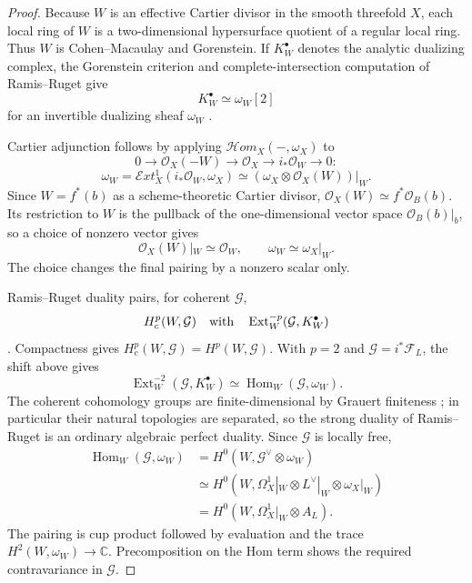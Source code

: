 \begin{proof}
Because $W$ is an effective Cartier divisor in the smooth threefold $X$,
each local ring of $W$ is a two-dimensional hypersurface quotient of a
regular local ring.  Thus $W$ is Cohen--Macaulay and Gorenstein.  If
$K_W^\bullet$ denotes the analytic dualizing complex, the Gorenstein
criterion and complete-intersection computation of Ramis--Ruget give
\[
 K_W^\bullet\simeq\omega_W[2]
\]
for an invertible dualizing sheaf $\omega_W$
\cite[Proposition~2 and the complete-intersection calculation,
pp.~90--91]{RamisRuget1970}.

Cartier adjunction follows by applying
$\mathcal Hom_X(-,\omega_X)$ to
\[
0\longrightarrow\mathcal O_X(-W)\longrightarrow\mathcal O_X
 \longrightarrow i_*\mathcal O_W\longrightarrow0:
\]
\[
 \omega_W=\mathcal Ext_X^1(i_*\mathcal O_W,\omega_X)
 \simeq(\omega_X\otimes\mathcal O_X(W))|_W.
\]
Since $W=f^*(b)$ as a scheme-theoretic Cartier divisor,
$\mathcal O_X(W)\simeq f^*\mathcal O_B(b)$.  Its restriction to $W$ is the
pullback of the one-dimensional vector space $\mathcal O_B(b)|_b$, so a
choice of nonzero vector gives
\[
 \mathcal O_X(W)|_W\simeq\mathcal O_W,
 \qquad \omega_W\simeq\omega_X|_W.
\]
The choice changes the final pairing by a nonzero scalar only.

Ramis--Ruget duality pairs, for coherent $\mathcal G$,
\[
 H_c^p(W,\mathcal G)
 \quad\hbox{with}\quad
 \operatorname{Ext}^{-p}_W(\mathcal G,K_W^\bullet)
\]
\cite[Theorem~2, pp.~82--83]{RamisRuget1970}.  Compactness gives
$H_c^p(W,\mathcal G)=H^p(W,\mathcal G)$.  With
$p=2$ and $\mathcal G=i^*\mathcal F_L$, the shift above gives
\[
 \operatorname{Ext}^{-2}_W(\mathcal G,K_W^\bullet)
 \simeq\operatorname{Hom}_W(\mathcal G,\omega_W).
\]
The coherent cohomology groups are finite-dimensional by Grauert finiteness
\cite{Grauert1960}; in particular their natural topologies are separated,
so the strong duality of Ramis--Ruget is an ordinary algebraic perfect
duality.  Since $\mathcal G$ is locally free,
\[
\begin{aligned}
 \operatorname{Hom}_W(\mathcal G,\omega_W)
 &=H^0(W,\mathcal G^\vee\otimes\omega_W)\\
 &\simeq
 H^0(W,\Omega_X^1|_W\otimes L^\vee|_W\otimes\omega_X|_W)\\
 &=H^0(W,\Omega_X^1|_W\otimes A_L).
\end{aligned}
\]
The pairing is cup product followed by evaluation and the trace
$H^2(W,\omega_W)\to\mathbb C$.  Precomposition on the Hom term shows the
required contravariance in $\mathcal G$.
\end{proof}

